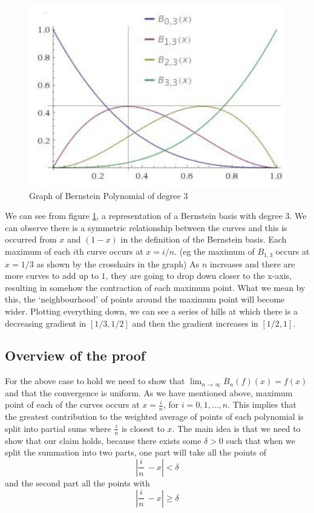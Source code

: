 \documentclass{article}
\begin{document}
\begin{figure}[h]
    \centering
    \includegraphics[width=1\textwidth, scale = 0.20]{BP.jpg}
    \caption{Graph of Bernstein Polynomial of degree $3$}
    \label{fig:2}
\end{figure}
\newpage
We can see from figure \ref{fig:2}, a representation of a Bernstein basis with degree $3$. We can observe there is a symmetric relationship between the curves and this is occurred from $x$ and $(1-x)$ in the definition of the Bernstein basis. Each maximum of each $i$th curve occurs at $x=i/n$. (eg the maximum of $B_{1,3}$ occurs at $x=1/3$ as shown by the crosshairs in the graph) As $n$ increases and there are more curves to add up to $1$, they are going to drop down closer to the x-axis, resulting in somehow the contraction of each maximum point. What we mean by this, the `neighbourhood' of points around the maximum point will become wider. Plotting everything down, we can see a series of hills at which there is a decreasing gradient in $[1/3, 1/2]$ and then the gradient increases in $[1/2, 1]$.
\subsection{Overview of the proof}
For the above case to hold we need to show that $\lim_{n \rightarrow{\infty} }B_n(f)(x)=f(x)$ and that the convergence is uniform. As we have mentioned above, maximum point of each of the curves occurs at $x=\frac{i}{n}$, for $i=0,1,…,n$. This implies that the greatest contribution to the weighted average of points of each polynomial is split into partial sums where $\frac{i}{n}$ is closest to $x$. The main idea is that we need to show that our claim holds, because there exists some $\delta>0$ such that when we split the summation into two parts, one part will take all the points of
\begin{equation}
\left|\frac{i}{n}\ - x\right|< \delta    
\end{equation}
 and the second part all the points with 
 \begin{equation}
  \left|\frac{i}{n}\ - x\right|\geq \delta   
 \end{equation}
\end{document}
